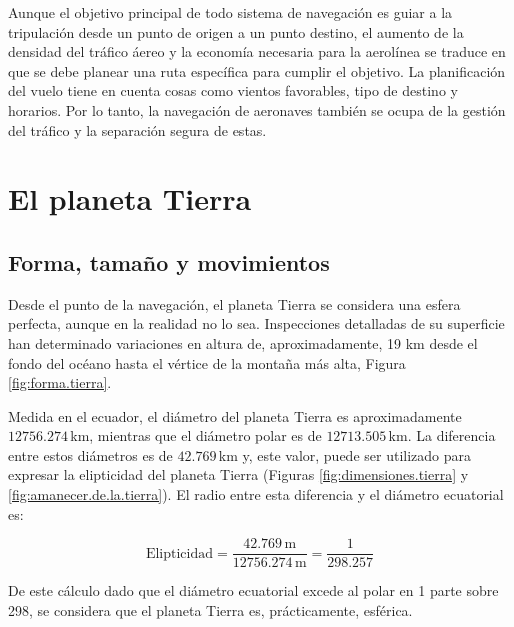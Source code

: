 Aunque el objetivo principal de todo sistema de navegaci\'on es guiar a la tripulación desde un punto de origen a  un punto destino, el aumento de la densidad del tráfico \'aereo y la economía necesaria para la aerolínea se traduce en que se debe planear una ruta específica para cumplir el objetivo. La planificación del vuelo tiene en cuenta cosas como vientos favorables, tipo de destino y horarios. Por lo tanto, la navegación de aeronaves también se ocupa de la gestión del tráfico y la separación segura de estas. 


\section{El planeta Tierra}
\label{sec:la.tierra}

\subsection{Forma, tama\~no y movimientos}
\label{sec:forma.y.tamanio}

Desde el punto de la navegaci\'on, el planeta Tierra se considera una esfera perfecta, aunque en la realidad no lo sea. Inspecciones detalladas de su superficie han determinado variaciones en altura de, aproximadamente, 19 km desde el fondo del oc\'eano hasta el v\'ertice de la monta\~na m\'as alta, Figura \ref{fig:forma.tierra}.

Medida en el ecuador, el di\'ametro del planeta  Tierra es aproximadamente $12756.274$\,km, mientras que el di\'ametro polar es de $12713.505$\,km. La diferencia entre estos di\'ametros es de $42.769$\,km y, este valor, puede ser utilizado para expresar la elipticidad del planeta Tierra (Figuras \ref{fig:dimensiones.tierra} y \ref{fig:amanecer.de.la.tierra}). El radio entre esta diferencia y el di\'ametro ecuatorial es:

\[\displaystyle
	\text{Elipticidad} = \frac{42.769 \,\text{m}}{ 12756.274\,\text{m}}
	=\frac{1}{298.257}
\]


De este c\'alculo dado que el di\'ametro ecuatorial excede al polar en 1 parte sobre 298, se considera que el planeta Tierra es, pr\'acticamente, esf\'erica. 


